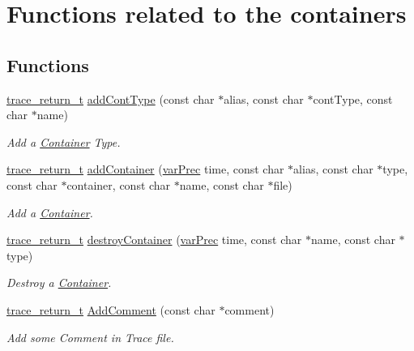 \hypertarget{group__procf}{\section{Functions related to the containers}
\label{group__procf}
}
\subsection*{Functions}
\begin{DoxyCompactItemize}
\item 
\hyperlink{group__type_ga1f1b68fb37d7331f03a48ef0993a0788}{trace\-\_\-return\-\_\-t} \hyperlink{group__procf_gad5822f320aedc792dc9a4c3a7c1f8751}{add\-Cont\-Type} (const char $\ast$alias, const char $\ast$cont\-Type, const char $\ast$name)
\begin{DoxyCompactList}\small\item\em Add a \hyperlink{structContainer}{Container} Type. \end{DoxyCompactList}\item 
\hyperlink{group__type_ga1f1b68fb37d7331f03a48ef0993a0788}{trace\-\_\-return\-\_\-t} \hyperlink{group__procf_gaef7a79f315b4e35480c27a1ae479827d}{add\-Container} (\hyperlink{group__type_gabda13d5bcd0cbdb094d655181a857e25}{var\-Prec} time, const char $\ast$alias, const char $\ast$type, const char $\ast$container, const char $\ast$name, const char $\ast$file)
\begin{DoxyCompactList}\small\item\em Add a \hyperlink{structContainer}{Container}. \end{DoxyCompactList}\item 
\hyperlink{group__type_ga1f1b68fb37d7331f03a48ef0993a0788}{trace\-\_\-return\-\_\-t} \hyperlink{group__procf_gae4eb01314299c2dcf82fd1b3faaf8ffa}{destroy\-Container} (\hyperlink{group__type_gabda13d5bcd0cbdb094d655181a857e25}{var\-Prec} time, const char $\ast$name, const char $\ast$type)
\begin{DoxyCompactList}\small\item\em Destroy a \hyperlink{structContainer}{Container}. \end{DoxyCompactList}\item 
\hyperlink{group__type_ga1f1b68fb37d7331f03a48ef0993a0788}{trace\-\_\-return\-\_\-t} \hyperlink{group__procf_ga463f260c133bb2471aad369b8d1319cb}{Add\-Comment} (const char $\ast$comment)
\begin{DoxyCompactList}\small\item\em Add some Comment in Trace file. \end{DoxyCompactList}\end{DoxyCompactItemize}



